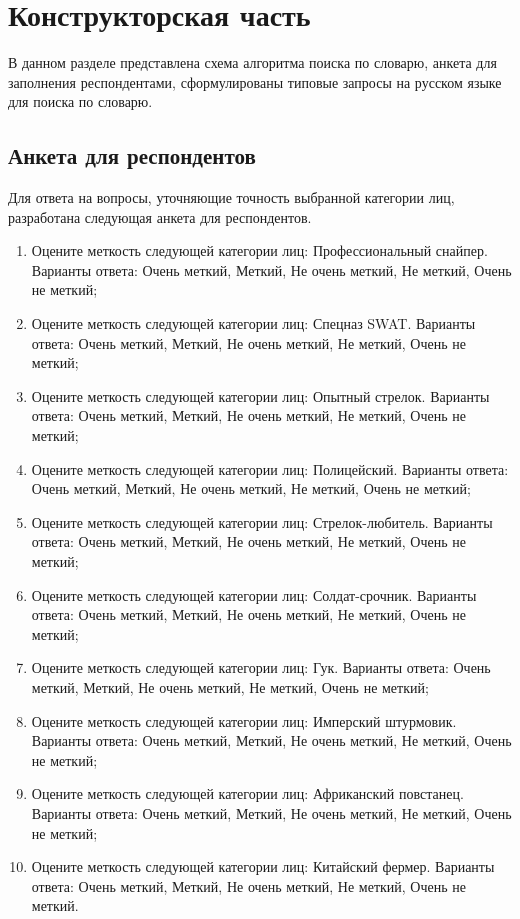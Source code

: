 \chapter{Конструкторская часть}
В данном разделе представлена схема алгоритма поиска по словарю, анкета для заполнения респондентами,
сформулированы типовые запросы на русском языке для поиска по словарю.
\section{Анкета для респондентов}\label{sec:anketa}
Для ответа на вопросы, уточняющие точность выбранной категории лиц, разработана следующая анкета для респондентов.
\begin{enumerate}[ 1{)}]
  \item Оцените меткость следующей категории лиц: Профессиональный снайпер. Варианты ответа: Очень меткий, Меткий, Не очень меткий, Не меткий, Очень не меткий;
  \item Оцените меткость следующей категории лиц: Спецназ SWAT. Варианты ответа: Очень меткий, Меткий, Не очень меткий, Не меткий, Очень не меткий;
  \item Оцените меткость следующей категории лиц: Опытный стрелок. Варианты ответа: Очень меткий, Меткий, Не очень меткий, Не меткий, Очень не меткий;
  \item Оцените меткость следующей категории лиц: Полицейский. Варианты ответа: Очень меткий, Меткий, Не очень меткий, Не меткий, Очень не меткий;
  \item Оцените меткость следующей категории лиц: Стрелок-любитель. Варианты ответа: Очень меткий, Меткий, Не очень меткий, Не меткий, Очень не меткий;
  \item Оцените меткость следующей категории лиц: Солдат-срочник. Варианты ответа: Очень меткий, Меткий, Не очень меткий, Не меткий, Очень не меткий;
  \item Оцените меткость следующей категории лиц: Гук. Варианты ответа: Очень меткий, Меткий, Не очень меткий, Не меткий, Очень не меткий;
  \item Оцените меткость следующей категории лиц: Имперский штурмовик. Варианты ответа: Очень меткий, Меткий, Не очень меткий, Не меткий, Очень не меткий;
  \item Оцените меткость следующей категории лиц: Африканский повстанец. Варианты ответа: Очень меткий, Меткий, Не очень меткий, Не меткий, Очень не меткий;
  \item Оцените меткость следующей категории лиц: Китайский фермер. Варианты ответа: Очень меткий, Меткий, Не очень меткий, Не меткий, Очень не меткий.
\end{enumerate}

